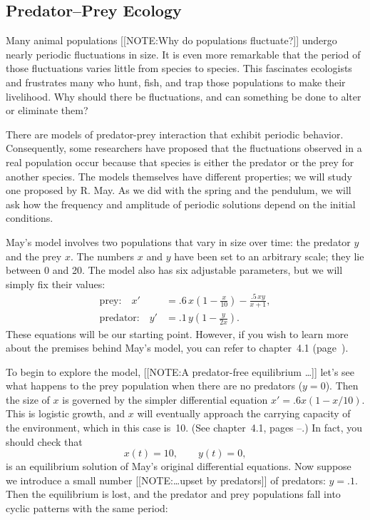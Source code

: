 \subsection{Predator--Prey Ecology}
\label{subsec:predator--prey-ecology}

\enlargethispage*{20pt}
Many animal populations 
[[NOTE:Why do populations fluctuate?]]	
undergo nearly periodic fluctuations in size.  It is even more
remarkable that the period of those fluctuations varies little from
species to species.  This fascinates ecologists and frustrates many
who hunt, fish, and trap those populations to make their livelihood.
Why should there be fluctuations, and can something be done to alter
or eliminate them?

There are models of predator-prey interaction that exhibit periodic
behavior.  Consequently, some researchers have proposed that the
fluctuations observed in a real population occur because that species
is either the predator or the prey for another species.  The models
themselves have different properties; we will study one proposed by
R. May.  As we did with the spring and the pendulum, we
will ask how the frequency and amplitude of periodic solutions depend
on the initial conditions.

May's model involves two populations that vary in size over time: the
predator $y$ and the prey $x$.  The numbers $x$ and $y$ have been set
to an arbitrary scale; they lie between 0 and 20.  The model also has
six adjustable parameters, but we will simply fix their
values:\label{May}
\begin{align*}
\mbox{prey:} \quad x' 
   &= .6\,x\left(1-\frac{x}{10}\right) - \frac{.5\,xy}{x+1}, \\
\mbox{predator:} \quad y' 
   &= .1\,y\left(1-\frac{y}{2x}\right).
\end{align*}
These equations will be our starting point.  However, if you wish to
learn more about the premises behind May's model, you can refer to
chapter~4.1 (page~\pageref{May model}).

To begin to explore the model, 
[[NOTE:A predator-free equilibrium \ldots]]	
let's see what happens to the prey population when there are no
predators ($y = 0$).  Then the size of $x$ is governed by the simpler
differential equation $x' = .6x(1 - x/10)$.  This is logistic growth,
and $x$ will eventually approach the carrying capacity of the
environment, which in this case is~10.  (See chapter~4.1, pages
\pageref{logistic-start}--\pageref{logistic-finish}.)  In fact, you
should check that
	\[
x(t) = 10, \qquad y(t) = 0,
\]
is an equilibrium solution of May's original differential equations.
Now suppose we introduce a small number  
[[NOTE:\ldots upset by predators]]	
of predators: $y = .1$.  Then the equilibrium is lost, and the
predator and prey populations fall into cyclic patterns with the same
period:

